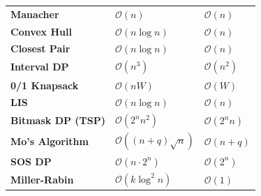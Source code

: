\documentclass[10pt,a4paper]{article}
\theoremstyle{cpstyle}
\newcommand{\bigO}[1]{\mathcal{O}\!\left(#1\right)}
\begin{document}
\begin{mdframed}[backgroundcolor=theorembg, linecolor=accent, linewidth=2pt,
  innerleftmargin=20pt, innerrightmargin=20pt, innertopmargin=16pt, innerbottommargin=16pt]
\begin{tabular}{>{\bfseries}p{4.5cm} p{3.5cm} p{4cm}}
Manacher & $\bigO{n}$ & $\bigO{n}$ \\
Convex Hull & $\bigO{n \log n}$ & $\bigO{n}$ \\
Closest Pair & $\bigO{n \log n}$ & $\bigO{n}$ \\
Interval DP & $\bigO{n^3}$ & $\bigO{n^2}$ \\
0/1 Knapsack & $\bigO{nW}$ & $\bigO{W}$ \\
LIS & $\bigO{n \log n}$ & $\bigO{n}$ \\
Bitmask DP (TSP) & $\bigO{2^n n^2}$ & $\bigO{2^n n}$ \\
Mo's Algorithm & $\bigO{(n+q)\sqrt{n}}$ & $\bigO{n+q}$ \\
SOS DP & $\bigO{n \cdot 2^n}$ & $\bigO{2^n}$ \\
Miller-Rabin & $\bigO{k \log^2 n}$ & $\bigO{1}$ \\
\bottomrule
\end{tabular}
\end{mdframed}
\end{document}
